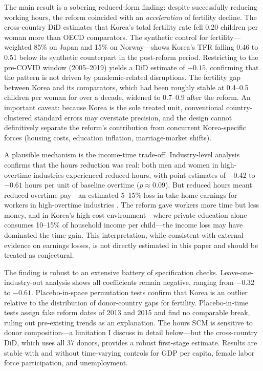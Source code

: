 \documentclass[12pt]{article}
\begin{document}
The main result is a sobering reduced-form finding: despite successfully reducing working hours, the reform coincided with an \textit{acceleration} of fertility decline. The cross-country DiD estimates that Korea's total fertility rate fell 0.20 children per woman more than OECD comparators. The synthetic control for fertility---weighted 85\% on Japan and 15\% on Norway---shows Korea's TFR falling 0.46 to 0.51 below its synthetic counterpart in the post-reform period. Restricting to the pre-COVID window (2005--2019) yields a DiD estimate of $-0.15$, confirming that the pattern is not driven by pandemic-related disruptions. The fertility gap between Korea and its comparators, which had been roughly stable at 0.4--0.5 children per woman for over a decade, widened to 0.7--0.9 after the reform. An important caveat: because Korea is the sole treated unit, conventional country-clustered standard errors may overstate precision, and the design cannot definitively separate the reform's contribution from concurrent Korea-specific forces (housing costs, education inflation, marriage-market shifts).

A plausible mechanism is the income-time trade-off. Industry-level analysis confirms that the hours reduction was real: both men and women in high-overtime industries experienced reduced hours, with point estimates of $-0.42$ to $-0.61$ hours per unit of baseline overtime ($p \approx 0.09$). But reduced hours meant reduced overtime pay---an estimated 5--15\% loss in take-home earnings for workers in high-overtime industries \citep{kli2020workhours}. The reform gave workers more time but less money, and in Korea's high-cost environment---where private education alone consumes 10--15\% of household income per child---the income loss may have dominated the time gain. This interpretation, while consistent with external evidence on earnings losses, is not directly estimated in this paper and should be treated as conjectural.

The finding is robust to an extensive battery of specification checks. Leave-one-industry-out analysis shows all coefficients remain negative, ranging from $-0.32$ to $-0.61$. Placebo-in-space permutation tests confirm that Korea is an outlier relative to the distribution of donor-country gaps for fertility. Placebo-in-time tests assign fake reform dates of 2013 and 2015 and find no comparable break, ruling out pre-existing trends as an explanation. The hours SCM is sensitive to donor composition---a limitation I discuss in detail below---but the cross-country DiD, which uses all 37 donors, provides a robust first-stage estimate. Results are stable with and without time-varying controls for GDP per capita, female labor force participation, and unemployment.
\end{document}
